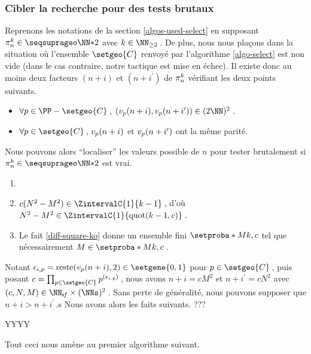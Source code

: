 \subsubsection{Cibler la recherche pour des tests brutaux} \label{algos-used-kill}

\leavevmode
\smallskip

Reprenons les notations de la section \ref{algos-used-select} en supposant $\consprod \in \NNssquare$ avec $k \in \NN_{\geq 2}$\,.
De plus, nous nous plaçons dans la situation où l'ensemble $\setgeo{C}$ renvoyé par l'algorithme \ref{algo-select} est non vide (dans le cas contraire, notre tactique est mise en échec).
Il existe donc au moins deux facteurs $(n+i)$ et $(n+i^\prime)$ de $\consprod$ vérifiant les deux points suivants.
%
\begin{itemize}
	\item $\forall p \in \PP - \setgeo{C}$\,, $( \padicval{n+i}, \padicval{n+i^\prime} ) \in ( 2 \NN )^2$\,.

	\item $\forall p \in \setgeo{C}$\,, $\padicval{n+i}$ et $\padicval{n+i^\prime}$ ont la même parité.
\end{itemize}

Nous pouvons alors \enquote{localiser} les valeurs possible de $n$ pour tester brutalement si $\consprod \in \NNssquare$ est vrai.
%
\begin{enumerate}
	\item 


	\item $c ( N^2 - M^2 ) \in \ZintervalC{1}{k-1}$\,, d'où $N^2 - M^2 \in \ZintervalC{1}{\quot{k-1}{c}}$\,.


	\item Le fait \ref{diff-square-ko} donne un ensemble fini $\setproba*{M}{k,c}$ tel que nécessairement $M \in \setproba*{M}{k,c}$\,.
\end{enumerate}


Notant $\epsilon_{i,p} = \reste{\padicval{n+i}}{2} \in \setgene{0, 1}$ pour $p \in \setgeo{C}$\,, puis posant $c = \prod_{p \in \setgeo{C}} p^{(\epsilon_{i,p})}$\,, nous avons $n+i = c M^2$ et $n+i^\prime = c N^2$ avec $(c, N, M) \in \NNsf \times ( \NNs )^2$\,.
Sans perte de généralité, nous pouvons supposer que $n + i > n+i^\prime$\,.s
Nous avons alors les faits suivants. 
???

YYYY







\newpage

Tout ceci nous amène au premier algorithme suivant.

{\small
\begin{algo}[frame] \label{algo-kill}
	\BlankLine
\end{algo}
}